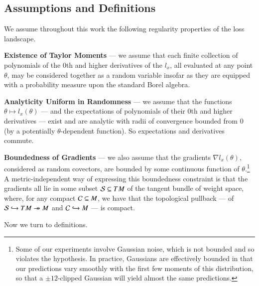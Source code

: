     \subsection{Assumptions and Definitions}                        \label{appendix:assumptions}
        We assume throughout this work the following regularity properties of
        the loss landscape.
        
        \textbf{Existence of Taylor Moments} --- we assume
        that each finite collection of polynomials of the $0$th and higher
        derivatives of the $l_x$, all evaluated at any point $\theta$, may be
        considered together as a random variable insofar as they are equipped
        with a probability measure upon the standard Borel algebra.

        \textbf{Analyticity Uniform in Randomness} --- we assume that
        the functions $\theta \mapsto l_x(\theta)$ --- and the expectations
        of polynomials of their $0$th and higher derivatives --- exist and are
        analytic with radii of convergence bounded from $0$ (by a potentially
        $\theta$-dependent function).  So expectations and derivatives commute. 

        \textbf{Boundedness of Gradients} --- we also assume that the gradients
        $\nabla l_x(\theta)$, considered as random covectors, are bounded by
        some continuous function of $\theta$.\footnote{
            Some of our experiments involve Gaussian noise, which is not
            bounded and so violates the hypothesis.  In practice, Gaussians are
            effectively bounded
            in that
            our predictions vary smoothly with the first few moments of this
            distribution, so that a $\pm 12$-clipped Gaussian will yield almost
            the same predictions.
        }
        A metric-independent way of expressing this boundedness constraint
        is that the gradients all lie in some subset $\mathcal{S} \subseteq TM$ of
        the tangent bundle of weight space, where, for any compact $\mathcal{C}
        \subseteq M$, we have that the topological pullback --- of
        $\mathcal{S} \hookrightarrow TM \twoheadrightarrow M$
        and
        $\mathcal{C} \hookrightarrow M$ ---
        is compact.
        
        Now we turn to definitions.

